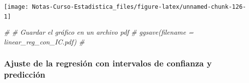 \documentclass[
  12pt,
]{book}
\newenvironment{Shaded}{\begin{snugshade}}{\end{snugshade}}
\newcommand{\CommentTok}[1]{\textcolor[rgb]{0.56,0.35,0.01}{\textit{#1}}}
\theoremstyle{definition}
\theoremstyle{definition}
\theoremstyle{definition}
\theoremstyle{definition}
\theoremstyle{remark}
\begin{document}
\begin{center}\texttt{[image: Notas-Curso-Estadistica\_files/figure-latex/unnamed-chunk-126-1]} \end{center}

\begin{Shaded}
\begin{Highlighting}[]
\CommentTok{\# \# Guardar el gráfico en un archivo pdf}
\CommentTok{\# ggsave(filename = \textquotesingle{}linear\_reg\_con\_IC.pdf\textquotesingle{}) \# }
\end{Highlighting}
\end{Shaded}

\hypertarget{ajuste-de-la-regresiuxf3n-con-intervalos-de-confianza-y-predicciuxf3n}{%
\subsubsection{Ajuste de la regresión con intervalos de confianza y predicción}\label{ajuste-de-la-regresiuxf3n-con-intervalos-de-confianza-y-predicciuxf3n}}
\end{document}
